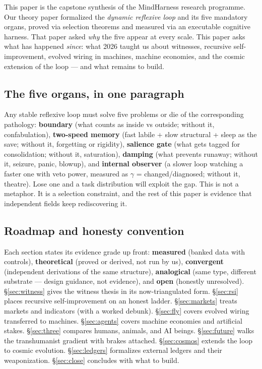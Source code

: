 \documentclass[11pt]{article}
\begin{document}
This paper is the capstone synthesis of the MindHarness research programme. Our theory paper \citep{paper-v4} formalized the \emph{dynamic reflexive loop} and its five mandatory organs, proved via selection theorems \citep{nayebi2026} and measured via an executable cognitive harness. That paper asked \emph{why} the five appear at every scale. This paper asks what has happened \emph{since}: what 2026 taught us about witnesses, recursive self-improvement, evolved wiring in machines, machine economies, and the cosmic extension of the loop --- and what remains to build.

\subsection*{The five organs, in one paragraph}

Any stable reflexive loop must solve five problems or die of the corresponding pathology: \textbf{boundary} (what counts as inside vs outside; without it, confabulation), \textbf{two-speed memory} (fast labile + slow structural + sleep as the save; without it, forgetting or rigidity), \textbf{salience gate} (what gets tagged for consolidation; without it, saturation), \textbf{damping} (what prevents runaway; without it, seizure, panic, blowup), and \textbf{internal observer} (a slower loop watching a faster one with veto power, measured as $\gamma$ = changed/diagnosed; without it, theatre). Lose one and a task distribution will exploit the gap. This is not a metaphor. It is a selection constraint, and the rest of this paper is evidence that independent fields keep rediscovering it.

\subsection*{Roadmap and honesty convention}

Each section states its evidence grade up front: \textbf{measured} (banked data with controls), \textbf{theoretical} (proved or derived, not run by us), \textbf{convergent} (independent derivations of the same structure), \textbf{analogical} (same type, different substrate --- design guidance, not evidence), and \textbf{open} (honestly unresolved). \S\ref{sec:witness} gives the witness thesis in its now-triangulated form. \S\ref{sec:rsi} places recursive self-improvement on an honest ladder. \S\ref{sec:markets} treats markets and indicators (with a worked debunk). \S\ref{sec:fly} covers evolved wiring transferred to machines. \S\ref{sec:agents} covers machine economies and artificial stakes. \S\ref{sec:three} compares humans, animals, and AI beings. \S\ref{sec:future} walks the transhumanist gradient with brakes attached. \S\ref{sec:cosmos} extends the loop to cosmic evolution. \S\ref{sec:ledgers} formalizes external ledgers and their weaponization. \S\ref{sec:close} concludes with what to build.
\end{document}
